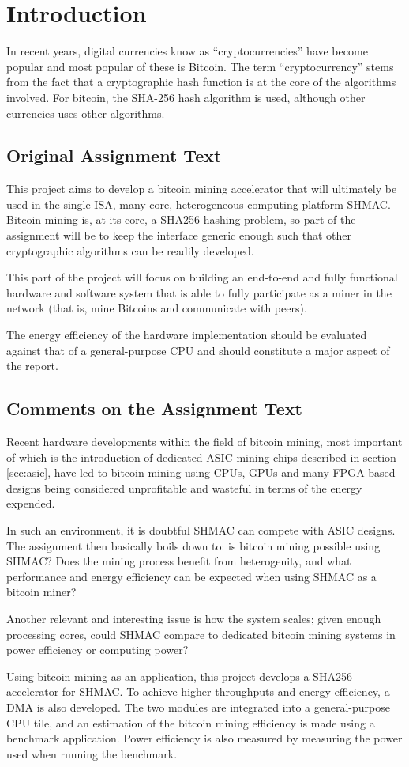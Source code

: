 \chapter{Introduction}

In recent years, digital currencies know as ``cryptocurrencies'' have become popular
and most popular of these is Bitcoin. The term ``cryptocurrency'' stems from the fact
that a cryptographic hash function is at the core of the algorithms involved. For bitcoin,
the SHA-256 hash algorithm is used, although other currencies uses other algorithms.

\section{Original Assignment Text}

This project aims to develop a bitcoin mining accelerator that will ultimately be
used in the single-ISA, many-core, heterogeneous computing platform SHMAC. Bitcoin
mining is, at its core, a SHA256 hashing problem, so part of the assignment will
be to keep the interface generic enough such that other cryptographic algorithms
can be readily developed.

This part of the project will focus on building an end-to-end and fully functional
hardware and software system that is able to fully participate as a miner in the
network (that is, mine Bitcoins and communicate with peers).

The energy efficiency of the hardware implementation should be evaluated against that
of a general-purpose CPU and should constitute a major aspect of the report.

\section{Comments on the Assignment Text}

Recent hardware developments within the field of bitcoin mining, most important of
which is the introduction of dedicated ASIC mining chips described in section \ref{sec:asic},
have led to bitcoin mining using CPUs, GPUs and many FPGA-based designs being considered
unprofitable and wasteful in terms of the energy expended.

In such an environment, it is doubtful SHMAC can compete with ASIC designs.
The assignment then basically boils down to: is bitcoin mining possible using SHMAC?
Does the mining process benefit from heterogenity, and what performance and energy
efficiency can be expected when using SHMAC as a bitcoin miner?

Another relevant and interesting issue is how the system scales; given enough processing
cores, could SHMAC compare to dedicated bitcoin mining systems in power efficiency or
computing power?

Using bitcoin mining as an application, this project develops a SHA256 accelerator
for SHMAC. To achieve higher throughputs and energy efficiency, a DMA is also developed.
The two modules are integrated into a general-purpose CPU tile, and an estimation of the
bitcoin mining efficiency is made using a benchmark application. Power efficiency is
also measured by measuring the power used when running the benchmark.


